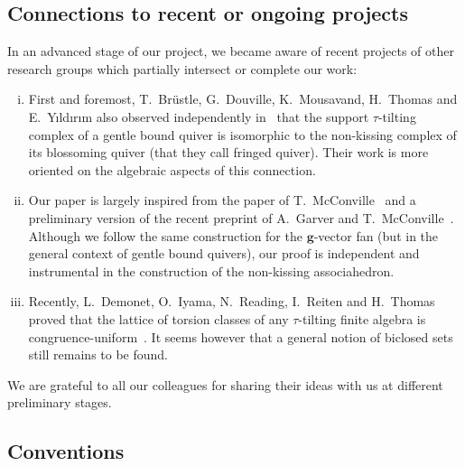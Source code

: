 \documentclass{amsart}
\theoremstyle{definition}
\renewcommand{\b}[1]{\mathbf{#1}} %
\begin{document}
\subsection*{Connections to recent or ongoing projects}

In an advanced stage of our project, we became aware of recent projects of other research groups which partially intersect or complete our work:
\begin{enumerate}[(i)]
\item First and foremost, T.~Br\"ustle, G.~Douville, K.~Mousavand, H.~Thomas and E.~Y\i{}ld\i{}r\i{}m also observed independently in~\cite{BrustleDouvilleMousavandThomasYildirim} that the support $\tau$-tilting complex of a gentle bound quiver is isomorphic to the non-kissing complex of its blossoming quiver (that they call fringed quiver). Their work is more oriented on the algebraic aspects of this connection.
\item Our paper is largely inspired from the paper of T.~McConville~\cite{McConville} and a preliminary version of the recent preprint of A.~Garver and T.~McConville~\cite{GarverMcConville-grid}. Although we follow the same construction for the $\b{g}$-vector fan (but in the general context of gentle bound quivers), our proof is independent and instrumental in the construction of the non-kissing associahedron.
\item Recently, L.~Demonet, O.~Iyama, N.~Reading, I.~Reiten and H.~Thomas proved that the lattice of torsion classes of any $\tau$-tilting finite algebra is congruence-uniform~\cite{DemonetIyamaReadingReitenThomas}. It seems however that a general notion of biclosed sets still remains to be found.
\end{enumerate}
We are grateful to all our colleagues for sharing their ideas with us at different preliminary stages.

\subsection*{Conventions}
\end{document}
